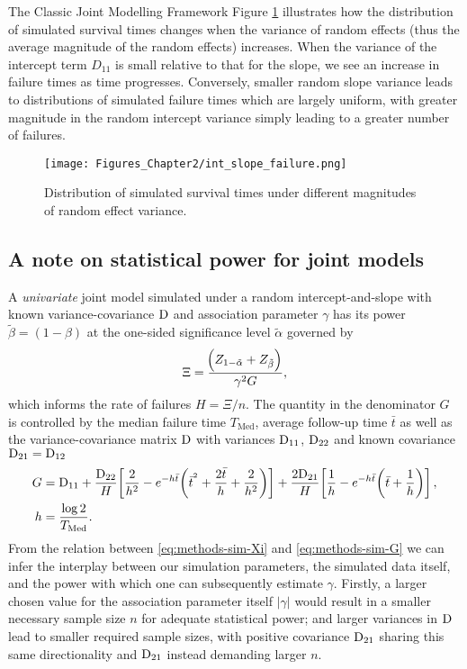 \begin{chapter}{\label{cha:methods-classic}The Classic Joint Modelling Framework}
  Figure \ref{fig:sim-intslope} illustrates how the distribution of simulated survival times changes when the variance of random effects (thus the average magnitude of the random effects) increases. When the variance of the intercept term $D_{11}$ is small relative to that for the slope, we see an increase in failure times as time progresses. Conversely, smaller random slope variance leads to distributions of simulated failure times which are largely uniform, with greater magnitude in the random intercept variance simply leading to a greater number of failures.
  \begin{figure}[t]
    \centering
    \texttt{[image: Figures\_Chapter2/int\_slope\_failure.png]}
    \caption{Distribution of simulated survival times under different magnitudes of random effect variance.}
  \label{fig:sim-intslope}
  \end{figure}

  \subsection{A note on statistical power for joint models}\label{sec:sim-considerations-power}
  A \textit{univariate} joint model simulated under a random intercept-and-slope with known variance-covariance $\mathrm{D}$ and association parameter $\gamma$ has its power $\tilde{\beta}=(1-\beta)$ at the one-sided significance level $\tilde{\alpha}$ governed by \citep{Chen2011}
  \begin{align}
      \Xi=\frac{\!\left( Z_{1-\tilde{\alpha}} + Z_{\tilde{\beta}}\right)}{\gamma^2G},
  \label{eq:methods-sim-Xi}
  \end{align}
  which informs the rate of failures $H=\Xi/n$. The quantity in the denominator $G$ is controlled by the median failure time $T_{\mathrm{Med}}$, average follow-up time $\bar{t}$ as well as the variance-covariance matrix $\mathrm{D}$ with variances $\mathrm{D}_{11}$, $\mathrm{D}_{22}$ and known covariance $\mathrm{D}_{21}=\mathrm{D}_{12}$
  \begin{equation}
      \begin{aligned}
          G&=\mathrm{D}_{11}+\frac{\mathrm{D}_{22}}{H}\!\left[\frac{2}{h^2}-e^{-h\bar{t}}\!\left(\bar{t}^{{}{^2}}+\frac{2\bar{t}}{h}+\frac{2}{h^2}\right)\right]+\frac{2\mathrm{D}_{21}}{H}\!\left[\frac{1}{h}-e^{-h\bar{t}}\!\left(\bar{t}+\frac{1}{h}\right)\right],\\
          h&=\frac{\log2}{T_{\mathrm{Med}}}.
      \end{aligned}
  \label{eq:methods-sim-G}
  \end{equation}
  From the relation between \eqref{eq:methods-sim-Xi} and \eqref{eq:methods-sim-G} we can infer the interplay between our simulation parameters, the simulated data itself, and the power with which one can subsequently estimate $\gamma$. Firstly, a larger chosen value for the association parameter itself $|\gamma|$ would result in a smaller necessary sample size $n$ for adequate statistical power; and larger variances in $\mathrm{D}$ lead to smaller required sample sizes, with positive covariance $\mathrm{D}_{21}$ sharing this same directionality and $\mathrm{D}_{21}$ instead demanding larger $n$.


\end{chapter}
